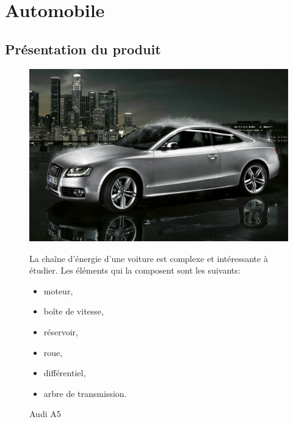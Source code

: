 

\section{Automobile}

\subsection{Présentation du produit}

\begin{figure}[htbp]
\begin{minipage}[c]{.40\linewidth}
\begin{center}
\includegraphics[width=\linewidth]{img/Audi_A5.jpg}
\caption{Audi A5}
\label{fig:image1}
\end{center}
\end{minipage}
\hfill
\begin{minipage}[c]{.55\linewidth}
La chaîne d'énergie d'une voiture est complexe et intéressante à étudier. Les éléments qui la composent sont les suivants: 
\begin{itemize}
 \item moteur,
 \item boîte de vitesse,
 \item réservoir,
 \item roue,
 \item différentiel,
 \item arbre de transmission.
\end{itemize}
\end{minipage}
\end{figure}

